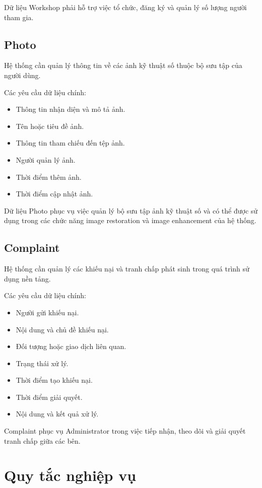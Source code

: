 Dữ liệu Workshop phải hỗ trợ việc tổ chức, đăng ký và quản lý số lượng người tham gia.

\subsection{Photo}

Hệ thống cần quản lý thông tin về các ảnh kỹ thuật số thuộc bộ sưu tập của người dùng.

Các yêu cầu dữ liệu chính:

\begin{itemize}
\item Thông tin nhận diện và mô tả ảnh.
\item Tên hoặc tiêu đề ảnh.
\item Thông tin tham chiếu đến tệp ảnh.
\item Người quản lý ảnh.
\item Thời điểm thêm ảnh.
\item Thời điểm cập nhật ảnh.
\end{itemize}

Dữ liệu Photo phục vụ việc quản lý bộ sưu tập ảnh kỹ thuật số và có thể được sử dụng trong các chức năng image restoration và image enhancement của hệ thống.

\subsection{Complaint}

Hệ thống cần quản lý các khiếu nại và tranh chấp phát sinh trong quá trình sử dụng nền tảng.

Các yêu cầu dữ liệu chính:

\begin{itemize}
\item Người gửi khiếu nại.
\item Nội dung và chủ đề khiếu nại.
\item Đối tượng hoặc giao dịch liên quan.
\item Trạng thái xử lý.
\item Thời điểm tạo khiếu nại.
\item Thời điểm giải quyết.
\item Nội dung và kết quả xử lý.
\end{itemize}

Complaint phục vụ Administrator trong việc tiếp nhận, theo dõi và giải quyết tranh chấp giữa các bên.

\section{Quy tắc nghiệp vụ}

